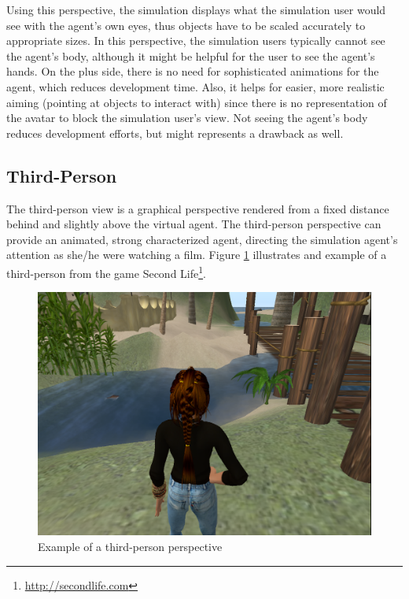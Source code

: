 Using this perspective, the simulation displays what the simulation user would see with the agent's own eyes, thus objects have to be scaled accurately to appropriate sizes. In this perspective, the simulation users typically cannot see the agent's body, although it might be helpful for the user to see the agent's hands. On the plus side, there is no need for sophisticated animations for the agent, which reduces development time. Also, it helps for easier, more realistic aiming (pointing at objects to interact with) since there is no representation of the avatar to block the simulation user's view. Not seeing the agent's body reduces development efforts, but might represents a drawback as well.\\

\subsection{Third-Person}\label{subsec:third_person}
The third-person view is a graphical perspective rendered from a fixed distance behind and slightly above the virtual agent. The third-person perspective can provide an animated, strong characterized agent, directing the simulation agent's attention as she/he were watching a film. Figure \ref{fig:req_third_person} illustrates and example of a third-person from the game Second Life\footnote{\url{http://secondlife.com}}.
\begin{figure}[H]
	\centering
	\includegraphics[width=\linewidth]{gfx/Chapter3/third_person}
	\caption{Example of a third-person perspective}
	\label{fig:req_third_person}
\end{figure}

